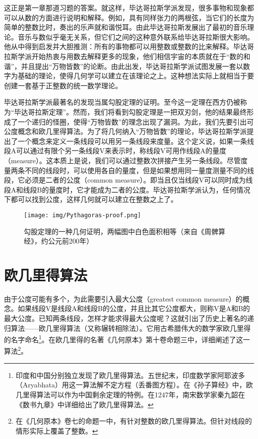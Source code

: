 \documentclass[b5paper]{ctexart}
\begin{document}
这正是第一章那道习题的答案。就这样，毕达哥拉斯学派发现，很多事物和现象都可以从数的方面进行说明和解释。例如，具有同样张力的两根弦，当它们的长度为简单的整数比时，奏出的乐声就和谐悦耳。由此毕达哥拉斯发展出了最初的音乐理论。音乐与数似乎毫无关系，但它们之间的这种意外联系给毕达哥拉斯很大影响。他从中得到启发并大胆推测：所有的事物都可以用整数或整数的比来解释。毕达哥拉斯学派开始热衷与用数去解释更多的现象，他们相信宇宙的本质就在于“数的和谐”，并且提出“万物皆数”的论断。由此出发，毕达哥拉斯学派试图发展一套以数字为基础的理论，使得几何学可以建立在该理论之上。这种想法实际上就相当于要创建一套基于正整数的统一数学理论。

 
毕达哥拉斯学派最著名的发现当属勾股定理的证明。至今这一定理在西方仍被称为“毕达哥拉斯定理”。然而，我们将看到勾股定理是一把双刃剑，他的结果最终形成了一个递归的怪圈，使得“万物皆数”的理念出现了漏洞。为此，我们先要引出可公度概念和欧几里得算法。为了将几何纳入“万物皆数”的理论，毕达哥拉斯学派提出了一个概念来定义一条线段可以用另一条线段来度量。这个定义说，如果一条线段A可以通过有限个另一条线段V来表示时，称线段V可用作线段A的量度（measure）。这本质上是说，我们可以通过整数次拼接产生另一条线段。尽管度量两条不同的线段时，可以使用各自的量度，但是如果想用同一量度测量不同的线段，它必须是二者的公度（common measure）。即当且仅当线段V可以同时成为线段A和线段B的量度时，它才能成为二者的公度。毕达哥拉斯学派认为，任何情况下都可以找到公度，这样几何就可以建立在整数之上了。

\begin{figure}[htbp]
 \centering
 \texttt{[image: img/Pythagoras-proof.png]}
 \caption{勾股定理的一种几何证明，两幅图中白色面积相等（来自《周髀算经》，约公元前200年）}
 \label{fig:Pythagoras-proof}
\end{figure}

\section{欧几里得算法}

由于公度可能有多个，为此需要引入最大公度（greatest common measure）的概念。如果线段V是线段A和线段B的公度，并且比其它公度都大，则称V是A和B的最大公度。已知两条线段，怎样才能求得最大公度呢？这就引出了历史上著名的递归算法——欧几里得算法（又称辗转相除法）。它用古希腊伟大的数学家欧几里得的名字命名\footnote{印度和中国分别独立发现了欧几里得算法。五世纪末，印度数学家阿耶波多（Aryabhata）用这一算法解不定方程（丢番图方程）。在《孙子算经》中，欧几里得算法可以作为中国剩余定理的特例。在1247年，南宋数学家秦九韶在《数书九章》中详细给出了欧几里得算法。}。在欧几里得的名著《几何原本》第十卷命题三中\cite{Elements}，详细阐述了这一算法\footnote{在《几何原本》卷七的命题一中，有针对整数的欧几里得算法。但针对线段的情形实际上覆盖了整数。}。
\end{document}
